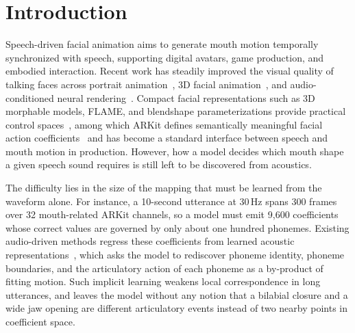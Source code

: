 \section{Introduction}
\label{sec:intro}

Speech-driven facial animation aims to generate mouth motion temporally synchronized with speech, supporting digital avatars, game production, and embodied interaction. Recent work has steadily improved the visual quality of talking faces across portrait animation~\citep{ji2021audio,zhang2023sadtalker,xu2024vasa,jiang2024loopy,xu2024hallo}, 3D facial animation~\citep{fan2022faceformer,xing2023codetalker}, and audio-conditioned neural rendering~\citep{guo2021ad,chen2025echomimic,ma2026esgaussianface}. Compact facial representations such as 3D morphable models, FLAME, and blendshape parameterizations provide practical control spaces~\citep{blanz2023morphable,li2017learning,menzel2022automated}, among which ARKit defines semantically meaningful facial action coefficients~\citep{apple_arkit} and has become a standard interface between speech and mouth motion in production. However, how a model decides which mouth shape a given speech sound requires is still left to be discovered from acoustics.

The difficulty lies in the size of the mapping that must be learned from the waveform alone. For instance, a 10-second utterance at 30\,Hz spans 300 frames over 32 mouth-related ARKit channels, so a model must emit 9{,}600 coefficients whose correct values are governed by only about one hundred phonemes. Existing audio-driven methods regress these coefficients from learned acoustic representations~\citep{cudeiro2019voca,richard2021meshtalk,fan2022faceformer,park2023said}, which asks the model to rediscover phoneme identity, phoneme boundaries, and the articulatory action of each phoneme as a by-product of fitting motion. Such implicit learning weakens local correspondence in long utterances, and leaves the model without any notion that a bilabial closure and a wide jaw opening are different articulatory events instead of two nearby points in coefficient space.

